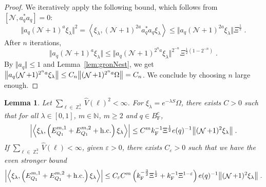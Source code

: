 \documentclass[12pt,a4paper]{article}
\numberwithin{equation}{section}
\newcommand{\cN}{\mathcal{N}}
\newcommand{\NNN}{\mathbb{N}}
\newcommand{\1}{\mathbb{I}}
\newcommand{\F}{\mathrm{F}}
\DeclareMathOperator{\Z}{\mathbb{Z}}
\DeclareMathOperator{\NN}{\mathcal{N}}
\newcommand{\half}{\frac{1}{2}}
\newcommand{\eva}[1]{\left\langle #1 \right\rangle}
\theoremstyle{plain}
\newtheorem{lemma}[theorem]{Lemma}
\theoremstyle{definition}
\theoremstyle{remark}
\theoremstyle{plain}
\theoremstyle{definition}
\theoremstyle{remark}
\begin{document}
\begin{proof}
We iteratively apply the following bound, which follows from $ [\cN, a_q^* a_q] = 0 $:
\begin{equation}
	\Vert a_q (\cN + 1)^a \xi_\lambda \Vert^2
	= \eva{\xi_\lambda, (\cN + 1)^{2a} a_q^* a_q \xi_\lambda}
	\le \Vert a_q (\cN + 1)^{2a} \xi_\lambda \Vert \Xi^{\frac 12} \;.
\end{equation}
After $ n $ iterations,
\begin{equation}
	\Vert a_q (\cN + 1)^a \xi_\lambda \Vert
	\le \Vert a_q (\cN + 1)^{2^n a} \xi_\lambda \Vert^{2^{-n}} \Xi^{\half (1-2^{-n})} \;.
\end{equation}
By $ \Vert a_q \Vert \le 1 $ and Lemma~\ref{lem:gronNest}, we get $ \norm{a_q (\NN+1)^{2^n a} \xi_\lambda} \leq C_n \norm{(\NN+1)^{2^n a} \Omega} = C_n $. We conclude by choosing $ n $ large enough.
\end{proof}


\begin{lemma} \label{lem:EQ111}
Let $ \sum_{\ell \in \Z^3_*} \hat{V}(\ell)^2 < \infty $. For $\xi_\lambda = e^{-\lambda S} \Omega$, there exists $ C > 0 $ such that for all $ \lambda \in [0,1] $, $ m \in \NNN $, $ m \ge 2 $ and $ q \in B_{\F}^c $,
\begin{equation} \label{eq:estEQ111_Coulomb}
\begin{aligned}
	\abs{\eva{\xi_\lambda,\left(E^{m,1}_{Q_1}+E^{m,2}_{Q_1}+\mathrm{h.c.}\right) \xi_\lambda }} 
	\leq C^m k_{\F}^{-1} \Xi^{\half} e(q)^{-1}
		\norm{ (\NN+1)^2 \xi_\lambda} \;.
\end{aligned}
\end{equation}
If $ \sum_{\ell \in \Z^3_*} \hat{V}(\ell) < \infty $, given $ \varepsilon > 0 $, there exists $ C_\varepsilon > 0 $ such that we have the even stronger bound
\begin{equation} \label{eq:estEQ111}
\begin{aligned}
	\abs{\eva{\xi_\lambda,\left(E^{m,1}_{Q_1}+E^{m,2}_{Q_1}+\mathrm{h.c.}\right) \xi_\lambda }} 
	\leq C_\varepsilon C^m \left(
		k_{\F}^{-\frac{3}{2}} \Xi^\half
		+ k_{\F}^{-1}\Xi^{1-\varepsilon} \right) e(q)^{-1}
		\norm{ (\NN+1)^2 \xi_\lambda} \;.
\end{aligned}
\end{equation}
\end{lemma}
\end{document}
